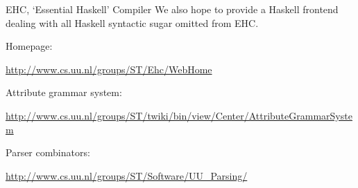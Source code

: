 \begin{hcarentry}{EHC, `Essential Haskell' Compiler}
We also hope to provide a Haskell frontend dealing with all Haskell
syntactic sugar omitted from EHC.

\FurtherReading
\begin{compactitem}
\item Homepage:

\url{http://www.cs.uu.nl/groups/ST/Ehc/WebHome}

\item Attribute grammar system:

\url{http://www.cs.uu.nl/groups/ST/twiki/bin/view/Center/AttributeGrammarSystem}

\item Parser combinators:

\url{http://www.cs.uu.nl/groups/ST/Software/UU_Parsing/}
\end{compactitem}  
\end{hcarentry}
